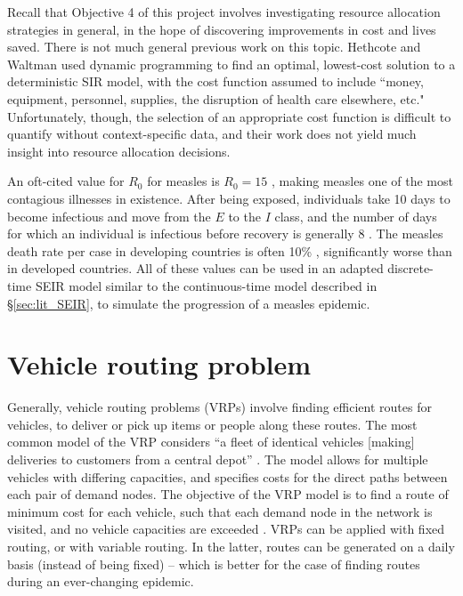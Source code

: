 Recall that Objective 4 of this project involves investigating resource allocation strategies in general, in the hope of discovering improvements in cost and lives saved. There is not much general previous work on this topic. Hethcote and Waltman \cite{hethcote1973optimal} used dynamic programming to find an optimal, lowest-cost solution to a deterministic SIR model, with the cost function assumed to include ``money, equipment, personnel, supplies, the disruption of health care elsewhere, etc." Unfortunately, though, the selection of an appropriate cost function is difficult to quantify without context-specific data, and their work does not yield much insight into resource allocation decisions.

An oft-cited value for $R_{0}$ for measles is $R_{0} = 15$ \cite{guerra2017basic}, making measles one of the most contagious illnesses in existence. After being exposed, individuals take 10 days to become infectious and move from the $E$ to the $I$ class, and the number of days for which an individual is infectious before recovery is generally 8 \cite{who_2019}. The measles death rate per case in developing countries is often 10\% \cite{moss2007measles}, significantly worse than in developed countries. All of these values can be used in an adapted discrete-time SEIR model similar to the continuous-time model described in \S \ref{sec:lit_SEIR}, to simulate the progression of a measles epidemic.

\section{Vehicle routing problem}
\label{sec:lit_VRP}
Generally, vehicle routing problems (VRPs) involve finding efficient routes for vehicles, to deliver or pick up items or people along these routes. The most common model of the VRP considers ``a fleet of identical vehicles [making] deliveries to customers from a central depot'' \cite{fisher1995vehicle}. The model allows for multiple vehicles with differing capacities, and specifies costs for the direct paths between each pair of demand nodes. The objective of the VRP model is to find a route of minimum cost for each vehicle, such that each demand node in the network is visited, and no vehicle capacities are exceeded \cite{fisher1995vehicle}. VRPs can be applied with fixed routing, or with variable routing. In the latter, routes can be generated on a daily basis (instead of being fixed) -- which is better for the case of finding routes during an ever-changing epidemic. 

